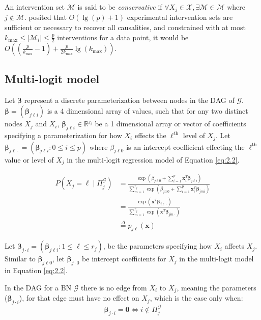 \documentclass[twoside,11pt]{article}
\let\mc\mathcal
\newcommand{\bmc}[1]{\bm{\mc{#1}}}
\let\mbf\mathbf
\begin{document}
An intervention set $\bmc M$ is said to be \textit{conservative} if $\forall{X_j\in\mc{X}}, \exists{\mc{M}\in\bmc{M}}$ where $j\not\in\mc{M}$. \citeauthor{eberhardt} posited that $O(\lg(p)+1)$ experimental intervention sets are sufficient or necessary to recover all causalities, and constrained with at most $k_\text{max}\leq{|\mc{M}_i|}\leq\frac{p}{2}$ interventions for a data point, it would be $O((\frac{p}{k_\text{max}}-1)+\frac{p}{2k_\text{max}}\lg(k_\text{max}))$.

\subsection{Multi-logit model}

Let $\bm{\beta}$ represent a discrete parameterization between nodes in the DAG of $\mc{G}$. $\bm{\beta}=(\bm\beta_{j\ell i})$ is a 4 dimensional array of values, such that for any two distinct nodes $X_j$ and $X_i$, $\bm\beta_{j\ell i}\in \mathbb{R}^{j_i}$ be a 1 dimensional array or vector of coefficients specifying a parameterization for how $X_i$ effects the $\ell^\text{th}$ level of $X_j$. Let $\bm\beta_{j\ell \cdot}=(\bm\beta_{j\ell i} : 0\leq i\leq p )$ where $\beta_{j\ell 0}$ is an intercept coefficient effecting the $\ell^\text{th}$ value or level of $X_j$ in the multi-logit regression model of Equation \eqref{eq:2.2}.


\begin{equation}
\label{eq:2.2}
\begin{aligned}
    P(X_j=\ell \mid \Pi^\mathcal{G}_j)&=\frac{\exp(\beta_{j\ell 0}+\sum_{i=1}^{p}\mbf{x}_i^T \bm{\beta}_{j\ell i})}{\sum_{m=1}^{r_j}\exp(\beta_{jm0}+\sum_{i=1}^{p}\mbf{x}_i^T \bm{\beta}_{jmi})} \\
    &=\frac{\exp(\mbf{x}^T \bm{\beta}_{j\ell\cdot})}{\sum_{m=1}^{r_j}\exp(\mbf{x}^T \bm{\beta}_{jm\cdot})}\\
    &\overset{\Delta}{=} p_{j\ell}(\mbf{x})
\end{aligned}
\end{equation}

Let $\bm\beta_{j\cdot i} = (\bm\beta_{j\ell i} : 1\leq\ell\leq r_j )$, be the parameters specifying how $X_i$ affects $X_j$. Similar to $\bm\beta_{j\ell 0}$, let $\bm\beta_{j\cdot 0}$ be intercept coefficients for  $X_j$ in the multi-logit model in Equation \eqref{eq:2.2}.

In the DAG for a BN $\mc{G}$ there is no edge from $X_i$ to $X_j$, meaning the parameters ($\bm\beta_{j\cdot i}$), for that edge must have no effect on $X_j$, which is the case only when:
\begin{equation}
    \bm\beta_{j\cdot i} = \mbf 0 \iff i \not\in \Pi_j^\mc{G} \label{eq:2.8}
\end{equation}
\end{document}
